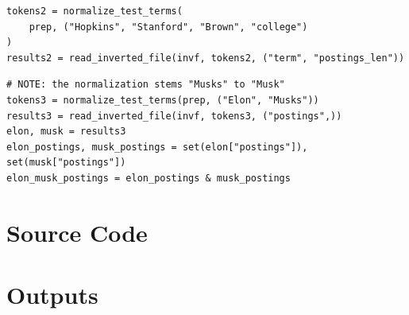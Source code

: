 \documentclass[11pt]{article}
\begin{document}

\begin{lstlisting}[style=mypython,caption=Test 2: Document frequency for the words: "Hopkins"\, "Stanford"\, "Brown"\, and "college"]
tokens2 = normalize_test_terms(
    prep, ("Hopkins", "Stanford", "Brown", "college")
)
results2 = read_inverted_file(invf, tokens2, ("term", "postings_len"))
\end{lstlisting}


\begin{lstlisting}[style=mypython,caption=Test 3: docids for documents that have both "Elon" and "Musk"]
# NOTE: the normalization stems "Musks" to "Musk"
tokens3 = normalize_test_terms(prep, ("Elon", "Musks"))
results3 = read_inverted_file(invf, tokens3, ("postings",))
elon, musk = results3
elon_postings, musk_postings = set(elon["postings"]), set(musk["postings"])
elon_musk_postings = elon_postings & musk_postings
\end{lstlisting}


\appendix

\section{Source Code} \label{appendix:src}



\section{Outputs} \label{appendix:outputs}


\end{document}
